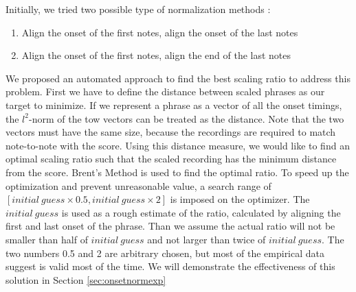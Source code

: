 
   Initially, we tried two possible type of normalization methods : 
   \begin{enumerate}
      \item Align the onset of the first notes, align the onset of the last notes
      \item Align the onset of the first notes, align the end of the last notes
   \end{enumerate}
   We proposed an automated approach to find the best scaling ratio to address this problem. First we have to define the distance between scaled phrases as our target to minimize. If we represent a phrase as a vector of all the onset timings, the $l^2$-norm of the tow vectors can be treated as the distance. Note that the two vectors must have the same size, because the recordings are required to match note-to-note with the score. Using this distance measure, we would like to find an optimal scaling ratio such that the scaled recording has the minimum distance from the score. Brent's Method\cite{brent1973} is used to find the optimal ratio. To speed up the optimization and prevent unreasonable value, a search range of $[initial\ guess \times 0.5 , initial\ guess \times 2]$ is imposed on the optimizer. The $initial\ guess$ is used as a rough estimate of the ratio, calculated by aligning the first and last onset of the phrase. Than we assume the actual ratio will not be smaller than half of $initial\ guess$ and not larger than twice of $initial\ guess$. The two numbers 0.5 and 2 are arbitrary chosen, but most of the empirical data suggest is valid most of the time. We will demonstrate the effectiveness of this solution in Section \ref{sec:onsetnormexp}


